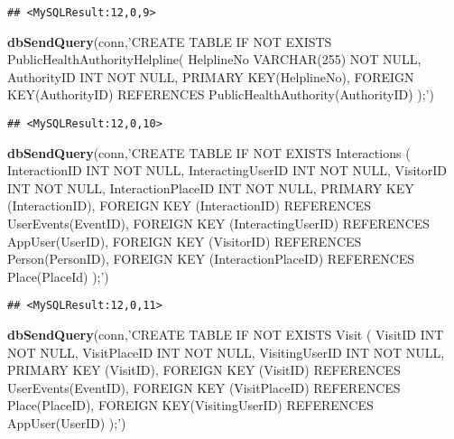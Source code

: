 \documentclass[
]{article}
\newenvironment{Shaded}{\begin{snugshade}}{\end{snugshade}}
\newcommand{\KeywordTok}[1]{\textcolor[rgb]{0.13,0.29,0.53}{\textbf{#1}}}
\newcommand{\NormalTok}[1]{#1}
\newcommand{\StringTok}[1]{\textcolor[rgb]{0.31,0.60,0.02}{#1}}
\begin{document}
\begin{verbatim}
## <MySQLResult:12,0,9>
\end{verbatim}

\begin{Shaded}
\begin{Highlighting}[]
\KeywordTok{dbSendQuery}\NormalTok{(conn,}\StringTok{'CREATE TABLE IF NOT EXISTS PublicHealthAuthorityHelpline(}
\StringTok{  HelplineNo VARCHAR(255) NOT NULL, }
\StringTok{  AuthorityID INT NOT NULL, }
\StringTok{  PRIMARY KEY(HelplineNo), }
\StringTok{  FOREIGN KEY(AuthorityID) REFERENCES PublicHealthAuthority(AuthorityID)}
\StringTok{);'}\NormalTok{)}
\end{Highlighting}
\end{Shaded}

\begin{verbatim}
## <MySQLResult:12,0,10>
\end{verbatim}

\begin{Shaded}
\begin{Highlighting}[]
\KeywordTok{dbSendQuery}\NormalTok{(conn,}\StringTok{'CREATE TABLE IF NOT EXISTS Interactions (}
\StringTok{  InteractionID INT NOT NULL, }
\StringTok{  InteractingUserID INT NOT NULL, }
\StringTok{  VisitorID INT NOT NULL, }
\StringTok{  InteractionPlaceID INT NOT NULL, }
\StringTok{  PRIMARY KEY (InteractionID), }
\StringTok{  FOREIGN KEY (InteractionID) REFERENCES UserEvents(EventID), }
\StringTok{  FOREIGN KEY (InteractingUserID) REFERENCES AppUser(UserID), }
\StringTok{  FOREIGN KEY (VisitorID) REFERENCES Person(PersonID), }
\StringTok{  FOREIGN KEY (InteractionPlaceID) REFERENCES Place(PlaceId)}
\StringTok{);'}\NormalTok{)}
\end{Highlighting}
\end{Shaded}

\begin{verbatim}
## <MySQLResult:12,0,11>
\end{verbatim}

\begin{Shaded}
\begin{Highlighting}[]
\KeywordTok{dbSendQuery}\NormalTok{(conn,}\StringTok{'CREATE TABLE IF NOT EXISTS Visit (}
\StringTok{  VisitID INT NOT NULL, }
\StringTok{  VisitPlaceID INT NOT NULL, }
\StringTok{  VisitingUserID INT NOT NULL, }
\StringTok{  PRIMARY KEY (VisitID), }
\StringTok{  FOREIGN KEY (VisitID) REFERENCES UserEvents(EventID), }
\StringTok{  FOREIGN KEY (VisitPlaceID) REFERENCES Place(PlaceID), }
\StringTok{  FOREIGN KEY(VisitingUserID) REFERENCES AppUser(UserID)}
\StringTok{);'}\NormalTok{)}
\end{Highlighting}
\end{Shaded}
\end{document}
